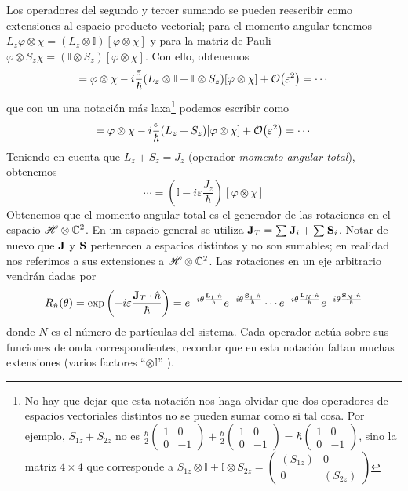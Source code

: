 Los operadores del segundo y tercer sumando se pueden reescribir como
extensiones al espacio producto vectorial; para el momento angular
tenemos $L_z \varphi \otimes \chi = (L_z\otimes \mathbb{I})[\varphi \otimes
\chi]$ y para la matriz de Pauli $ \varphi \otimes S_z\chi = ( \mathbb{I} \otimes
S_z)[\varphi \otimes \chi]$. Con ello, obtenemos
\begin{equation}
  =\varphi \otimes \chi - i \frac{\varepsilon}{\hbar} (L_z\otimes \mathbb{I}+
  \mathbb{I}\otimes S_z)
  [\varphi\otimes\chi] + \order{\varepsilon^2} = \cdots
\end{equation}
que con un una notación más laxa\footnote{No hay que dejar que esta
  notación nos haga olvidar que dos operadores de espacios vectoriales
distintos no se pueden sumar como si tal cosa. Por ejemplo, $S_{1z}+S_{2z}$
no es $\frac{\hbar}{2}\begin{pmatrix} 1 & 0 \\ 0 & -1 \end{pmatrix} +
\frac{\hbar}{2}\begin{pmatrix} 1 & 0 \\ 0 & -1 \end{pmatrix}  =
\hbar \begin{pmatrix} 1 & 0 \\ 0 & -1 \end{pmatrix} $, sino la matriz
$4\times 4$ que corresponde a $S_{1z}\otimes \mathbb{I} +
\mathbb{I}\otimes S_{2z} = \begin{pmatrix} (S_{1z}) & 0 \\ 0 & (S_{2z}) \end{pmatrix}$ } podemos escribir como
\begin{equation}
  =\varphi \otimes \chi - i \frac{\varepsilon}{\hbar} (L_z+
  S_z)
  [\varphi\otimes\chi] + \order{\varepsilon^2} = \cdots
\end{equation}
Teniendo en cuenta que $L_z + S_z = J_z$ (operador \emph{momento
  angular total}), obtenemos
\begin{equation}
  \cdots = \left( \mathbb{I} - i \varepsilon \frac{J_z}{\hbar}
  \right)[\varphi\otimes \chi]
\end{equation} 
Obtenemos que el momento angular total es el generador de las
rotaciones en el espacio $ \mathscr{H} \otimes \mathbb{C}^2$. En
un espacio general se utiliza $\bm{\mathrm{J}}_T = \sum_{ }\bm{\mathrm{J}}_i +
\sum_{ }\bm{\mathrm{S}}_i$. Notar de nuevo que $\bm{\mathrm{J}}$ y $\bm{\mathrm{S}}$
pertenecen a espacios distintos y no son sumables; en realidad nos
referimos a sus extensiones a $ \mathscr{H} \otimes \mathbb{C}^2$. Las
rotaciones en un eje arbitrario vendrán dadas por
\begin{equation}
R_{\hat{n}} (\theta) = \exp \left( -i \varepsilon \frac{\bm{\mathrm{J}}_T\cdot
    \hat{n}}{\hbar} \right) = e^{-i\theta \frac{\bm{\mathrm{L}}_1 \cdot
    \hat{n}}{\hbar}} e^{-i\theta \frac{\bm{\mathrm{S}}_1 \cdot \hat{n}}{\hbar}}
\cdots e^{-i\theta \frac{\bm{\mathrm{L}}_N \cdot \hat{n}}{\hbar}} e^{-i\theta \frac{\bm{\mathrm{S}}_N \cdot \hat{n}}{\hbar}}
\end{equation}
donde $N$ es el número de partículas del sistema. Cada operador actúa
sobre sus funciones de onda correspondientes, recordar que en esta
notación faltan muchas extensiones (varios factores ``$\otimes \mathbb{I}$'' ).

